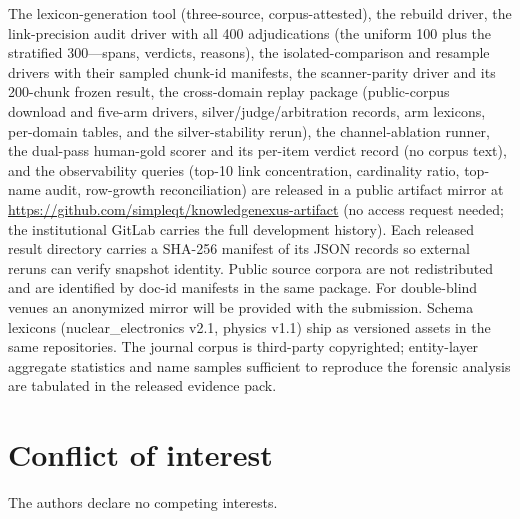 \documentclass[preprint,12pt]{elsarticle}
\begin{document}
The lexicon-generation tool (three-source, corpus-attested), the rebuild
driver, the link-precision audit driver with all 400 adjudications
(the uniform 100 plus the stratified 300---spans, verdicts, reasons),
the isolated-comparison and resample drivers with their sampled
chunk-id manifests, the scanner-parity driver and its 200-chunk frozen
result, the cross-domain replay package (public-corpus download and
five-arm drivers, silver/judge/arbitration records, arm lexicons,
per-domain tables, and the silver-stability rerun), the
channel-ablation runner, the dual-pass human-gold scorer and its
per-item verdict record (no corpus text), and the observability
queries (top-10 link concentration, cardinality ratio, top-name audit,
row-growth reconciliation) are released in a public artifact mirror at
\url{https://github.com/simpleqt/knowledgenexus-artifact} (no access
request needed; the institutional GitLab carries the full development
history). Each released result directory carries a SHA-256 manifest
of its JSON records so external reruns can verify snapshot identity. Public source corpora are not redistributed and are
identified by doc-id manifests in the same package. For double-blind
venues an anonymized mirror will be provided
with the submission. Schema lexicons (nuclear\_electronics v2.1, physics
v1.1) ship as versioned assets in the same repositories. The journal
corpus is third-party copyrighted; entity-layer aggregate statistics and
name samples sufficient to reproduce the forensic analysis are tabulated
in the released evidence pack.

\section*{Conflict of interest}

The authors declare no competing interests.
\end{document}
